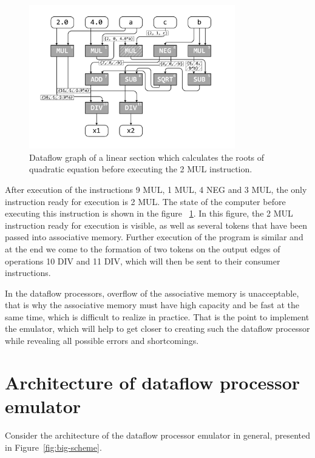 \documentclass[
11pt,%
tightenlines,%
twoside,%
onecolumn,%
nofloats,%
nobibnotes,%
nofootinbib,%
superscriptaddress,%
noshowpacs,%
centertags]%
{revtex4}
\begin{document}
\begin{figure}[h]
\setcaptionmargin{5mm} %
\includegraphics[width=0.80\textwidth]{pics/dataflow2.pdf}
\caption{Dataflow graph of a linear section which calculates the roots of quadratic equation before executing the 2 MUL instruction.}\label{fig:dataflow2}
\end{figure}

After execution of the instructions 9 MUL, 1 MUL, 4 NEG and 3 MUL, the only instruction ready for execution is 2 MUL.
The state of the computer before executing this instruction is shown in the figure ~\ref{fig:dataflow2}.
In this figure, the 2 MUL instruction ready for execution is visible, as well as several tokens that have been passed into associative memory.
Further execution of the program is similar and at the end we come to the formation of two tokens on the output edges of operations 10 DIV and 11 DIV, which will then be sent to their consumer instructions.

In the dataflow processors, overflow of the associative memory is unacceptable, that is why the associative memory must have high capacity and be fast at the same time, which is difficult to realize in practice.
That is the point to implement the emulator, which will help to get closer to creating such the dataflow processor while revealing all possible errors and shortcomings.

\section{Architecture of dataflow processor emulator}

Consider the architecture of the dataflow processor emulator in general, presented in Figure~\ref{fig:big-scheme}.
\end{document}
